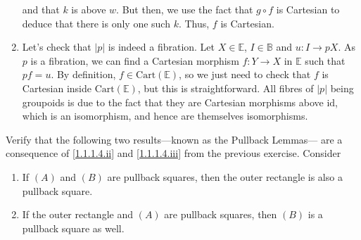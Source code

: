 \documentclass{report}
\newcommand{\bE}[0]{\mathbb E}
\newcommand{\bB}[0]{\mathbb B}
\newcommand{\Cart}[0]{\mathrm{Cart}}
\newcommand{\idd}[0]{\mathrm{id}}
\begin{document}
\begin{answer}
\begin{enumerate}[label=(\roman*)]
        and that $k$ is above $w$. But then, we use the fact that $g\circ f$ is Cartesian to deduce that
        there is only one such $k$. Thus, $f$ is Cartesian.
        \begin{center}
        \end{center}
        \item Let's check that $|p|$ is indeed a fibration. Let $X \in \bE$, $I\in\bB$ and $u : I \to pX$.
        As $p$ is a fibration, we can find a Cartesian morphism $f : Y \to X$ in $\bE$ such that $pf = u$.
        By definition, $f \in \Cart(\bE)$, so we just need to check that $f$ is Cartesian inside $\Cart(\bE)$,
        but this is straightforward. All fibres of $|p|$ being groupoids is due to the fact that they are
        Cartesian morphisms above $\idd$, which is an isomorphism, and hence are themselves isomorphisms.
    \end{enumerate}
\end{answer}

\begin{exo}
    Verify that the following two results---known as the Pullback Lemmas--- are a consequence of 
    \ref{1.1.1.4.ii} and \ref{1.1.1.4.iii} from the previous exercise. Consider
    \begin{center}
    \end{center}
    \begin{enumerate}
        \item If $(A)$ and $(B)$ are pullback squares, then the outer rectangle is also a pullback
        square.
        \item If the outer rectangle and $(A)$ are pullback squares, then $(B)$ is a pullback square
        as well.
    \end{enumerate}
\end{exo}
\end{document}
